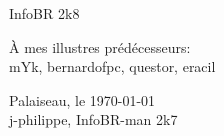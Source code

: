 \thispagestyle{empty}

\begin{center}
\begin{Huge}
InfoBR 2k8
\end{Huge}
\end{center}


\begin{flushright}
\begin{large} 
 { \selectfont
\`A mes illustres prédécesseurs:\\
\smallskip
mYk, bernardofpc, questor, eracil \\ }
\end{large}
\vspace{1cm}
{Palaiseau, le \today \\
\medskip
 j-philippe, InfoBR-man 2k7  }
\end{flushright} 



\newpage
\thispagestyle{empty}
\vspace*{1cm}
\newpage
